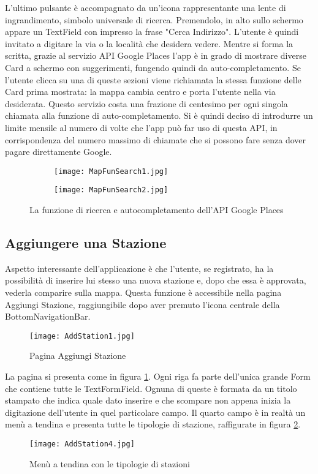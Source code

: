 L'ultimo pulsante è accompagnato da un'icona rappresentante una lente di
ingrandimento, simbolo universale di ricerca. Premendolo, in alto sullo schermo
appare un TextField con impresso la frase "Cerca Indirizzo". L'utente è quindi
invitato a digitare la via o la località che desidera vedere. Mentre si forma la
scritta, grazie al servizio API Google Places l'app è in grado di mostrare
diverse Card a schermo con suggerimenti, fungendo quindi da auto-completamento.
Se l'utente clicca su una di queste sezioni viene richiamata la stessa funzione
delle Card prima mostrata: la mappa cambia centro e porta l'utente nella via
desiderata. Questo servizio costa una frazione di centesimo per ogni singola
chiamata alla funzione di auto-completamento. Si è quindi deciso di introdurre
un limite mensile al numero di volte che l'app può far uso di questa API, in
corrispondenza del numero massimo di chiamate che si possono fare senza dover
pagare direttamente Google.
\begin{figure}[h!]
    \centering
    \begin{subfigure}{0.33\linewidth}
        \texttt{[image: MapFunSearch1.jpg]}
    \end{subfigure}
    \begin{subfigure}{0.33\linewidth}
        \texttt{[image: MapFunSearch2.jpg]}
    \end{subfigure}
    \caption{La funzione di ricerca e autocompletamento dell'API Google Places}
\end{figure}

\subsection{Aggiungere una Stazione}
Aspetto interessante dell'applicazione è che l'utente, se registrato, ha la
possibilità di inserire lui stesso una nuova stazione e, dopo che essa è
approvata, vederla comparire sulla mappa. Questa funzione è accessibile nella
pagina Aggiungi Stazione, raggiungibile dopo aver premuto l'icona centrale della
BottomNavigationBar. 
\begin{figure}[!h]
    \centering
    \texttt{[image: AddStation1.jpg]}
    \caption{Pagina Aggiungi Stazione}
    \label{addStation1}
\end{figure}
La pagina si presenta come in figura \ref{addStation1}. Ogni riga fa parte
dell'unica grande Form che contiene tutte le TextFormField. Ognuna di queste è
formata da un titolo stampato che indica quale dato inserire e che scompare non
appena inizia la digitazione dell'utente in quel particolare campo. 
Il quarto campo è in realtà un menù a tendina e presenta tutte le tipologie di
stazione, raffigurate in figura \ref{addStation4}.
\begin{figure}[!h]
    \centering
    \texttt{[image: AddStation4.jpg]}
    \caption{Menù a tendina con le tipologie di stazioni}
    \label{addStation4}
\end{figure}

